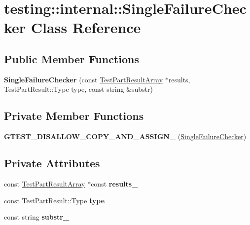 \hypertarget{classtesting_1_1internal_1_1_single_failure_checker}{}\section{testing\+:\+:internal\+:\+:Single\+Failure\+Checker Class Reference}
\label{classtesting_1_1internal_1_1_single_failure_checker}
\subsection*{Public Member Functions}
\begin{DoxyCompactItemize}
\item 
\mbox{\label{classtesting_1_1internal_1_1_single_failure_checker_a6d350d385526c97c9982e928f5f8fb56}} 
{\bfseries Single\+Failure\+Checker} (const \hyperlink{classtesting_1_1_test_part_result_array}{Test\+Part\+Result\+Array} $\ast$results, Test\+Part\+Result\+::\+Type type, const string \&substr)
\end{DoxyCompactItemize}
\subsection*{Private Member Functions}
\begin{DoxyCompactItemize}
\item 
\mbox{\label{classtesting_1_1internal_1_1_single_failure_checker_a381cef530568cc08d07dfa2a5dcfc233}} 
{\bfseries G\+T\+E\+S\+T\+\_\+\+D\+I\+S\+A\+L\+L\+O\+W\+\_\+\+C\+O\+P\+Y\+\_\+\+A\+N\+D\+\_\+\+A\+S\+S\+I\+G\+N\+\_\+} (\hyperlink{classtesting_1_1internal_1_1_single_failure_checker}{Single\+Failure\+Checker})
\end{DoxyCompactItemize}
\subsection*{Private Attributes}
\begin{DoxyCompactItemize}
\item 
\mbox{\label{classtesting_1_1internal_1_1_single_failure_checker_af6216677e2186e9481088daf57c17d21}} 
const \hyperlink{classtesting_1_1_test_part_result_array}{Test\+Part\+Result\+Array} $\ast$const {\bfseries results\+\_\+}
\item 
\mbox{\label{classtesting_1_1internal_1_1_single_failure_checker_a8fc33138c357b2a6ede3698eb57548a7}} 
const Test\+Part\+Result\+::\+Type {\bfseries type\+\_\+}
\item 
\mbox{\label{classtesting_1_1internal_1_1_single_failure_checker_a2003215f5f3147726e0b3bb4c8954d71}} 
const string {\bfseries substr\+\_\+}
\end{DoxyCompactItemize}


